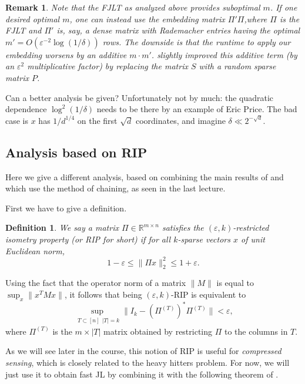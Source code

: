 \documentclass[11pt]{article}
\newcommand{\eps}{\varepsilon}
\newcommand{\R}{\mathbb{R}}
\newtheorem{remark}{Remark}
\newtheorem{definition}{Definition}
\newcommand{\RemarkName}[1]{\label{rem:#1}}
\begin{document}
\begin{remark}\RemarkName{useP}
	\textup{
		Note that the FJLT as analyzed above provides suboptimal $m$. If one desired optimal $m$, one can instead use the embedding matrix $\Pi' \Pi$,where $\Pi$ is the FJLT and $\Pi'$ is, say, a dense matrix with Rademacher entries having the optimal $m' = O(\eps^{-2}\log(1/\delta))$ rows. The downside is that the runtime to apply our embedding worsens by an additive $m\cdot m'$. \cite{AilonC09} slightly improved this additive term (by an $\eps^2$ multiplicative factor) by replacing the matrix $S$ with a random sparse matrix $P$.
	}
\end{remark}

Can a better analysis be given? Unfortunately not by much: the quadratic dependence $\log^2(1/\delta)$ needs to be there by an example of Eric Price. The bad case is $x$ has $1/d^{1/4}$ on the first $\sqrt d$ coordinates, and imagine $\delta \ll 2^{-\sqrt d}$.

\subsection{Analysis based on RIP}

Here we give a different analysis, based on combining the main results of \cite{KrahmerW11} and \cite{RudelsonV08} which use the method of chaining, as seen in the last lecture.

First we have to give a definition.

\begin{definition}
	We say a matrix $\Pi\in\R^{m\times n}$ satisfies the {\em $(\eps,k)$-restricted isometry property} (or {\em RIP} for short) if for all $k$-sparse vectors $x$ of unit Euclidean norm,
	$$
	1-\eps \le \|\Pi x\|_2^2 \le 1+\eps .
	$$
\end{definition}

Using the fact that the operator norm of a matrix $\|M\|$ is equal to $\sup_{x}\|x^TMx\|$, it follows that being $(\eps,k)$-RIP is equivalent to
$$
\sup_{\substack{T\subset [n]}{|T| = k}} \| I_k - (\Pi^{(T)})^* \Pi^{(T)} \| < \eps ,
$$
where $\Pi^{(T)}$ is the $m\times |T|$ matrix obtained by restricting $\Pi$ to the columns in $T$.

As we will see later in the course, this notion of RIP is useful for {\em compressed sensing}, which is closely related to the heavy hitters problem. For now, we will just use it to obtain fast JL by combining it with the following theorem of \cite{KrahmerW11}.
\end{document}
